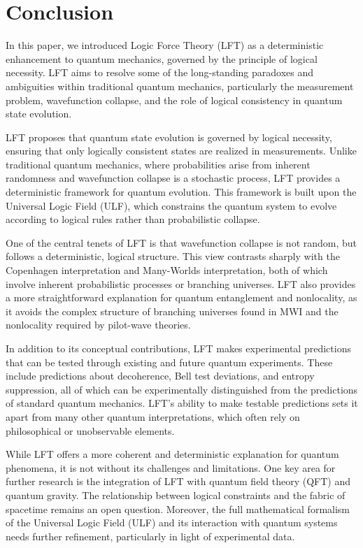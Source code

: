 \section{Conclusion}

In this paper, we introduced Logic Force Theory (LFT) as a deterministic enhancement to quantum mechanics, governed by the principle of logical necessity. LFT aims to resolve some of the long-standing paradoxes and ambiguities within traditional quantum mechanics, particularly the measurement problem, wavefunction collapse, and the role of logical consistency in quantum state evolution.

LFT proposes that quantum state evolution is governed by logical necessity, ensuring that only logically consistent states are realized in measurements. Unlike traditional quantum mechanics, where probabilities arise from inherent randomness and wavefunction collapse is a stochastic process, LFT provides a deterministic framework for quantum evolution. This framework is built upon the Universal Logic Field (ULF), which constrains the quantum system to evolve according to logical rules rather than probabilistic collapse.

One of the central tenets of LFT is that wavefunction collapse is not random, but follows a deterministic, logical structure. This view contrasts sharply with the Copenhagen interpretation and Many-Worlds interpretation, both of which involve inherent probabilistic processes or branching universes. LFT also provides a more straightforward explanation for quantum entanglement and nonlocality, as it avoids the complex structure of branching universes found in MWI and the nonlocality required by pilot-wave theories.

In addition to its conceptual contributions, LFT makes experimental predictions that can be tested through existing and future quantum experiments. These include predictions about decoherence, Bell test deviations, and entropy suppression, all of which can be experimentally distinguished from the predictions of standard quantum mechanics. LFT’s ability to make testable predictions sets it apart from many other quantum interpretations, which often rely on philosophical or unobservable elements.

While LFT offers a more coherent and deterministic explanation for quantum phenomena, it is not without its challenges and limitations. One key area for further research is the integration of LFT with quantum field theory (QFT) and quantum gravity. The relationship between logical constraints and the fabric of spacetime remains an open question. Moreover, the full mathematical formalism of the Universal Logic Field (ULF) and its interaction with quantum systems needs further refinement, particularly in light of experimental data.

